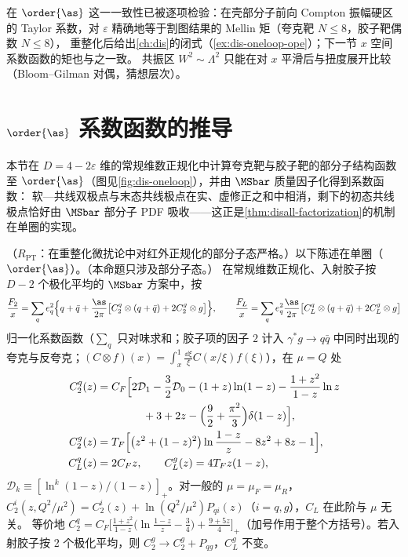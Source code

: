 \noindent
在 $\order{\as}$ 这一一致性已被逐项检验：在壳部分子前向 Compton 振幅硬区的 Taylor 系数，对 $\varepsilon$ 精确地等于割图结果的 Mellin 矩（夸克靶 $N\le8$，胶子靶偶数 $N\le8$），
重整化后给出\cref{ch:dis}的闭式（\cref{ex:dis-oneloop-ope}）；下一节 $x$ 空间系数函数的矩也与之一致。   %
共振区 $W^2\sim\Lambda^2$ 只能在对 $x$ 平滑后与扭度展开比较（Bloom--Gilman 对偶，猜想层次）。

\section{$\order{\as}$ 系数函数的推导}\label{sec:disall-nlo}

本节在 $D=4-2\varepsilon$ 维的常规维数正规化中计算夸克靶与胶子靶的部分子结构函数至 $\order{\as}$（图见\cref{fig:dis-oneloop}），并由 $\MSbar$ 质量因子化得到系数函数：
软—共线双极点与末态共线极点在实、虚修正之和中相消，剩下的初态共线极点恰好由 $\MSbar$ 部分子 PDF 吸收——这正是\cref{thm:disall-factorization}的机制在单圈的实现。

\begin{proposition}\label{prop:disall-nlo}
（$R_{\mathrm{PT}}$：在重整化微扰论中对红外正规化的部分子态严格。）以下陈述在单圈（$\order{\as}$）。（本命题只涉及部分子态。）
在常规维数正规化、入射胶子按 $D-2$ 个极化平均的 $\MSbar$ 方案中，按
\begin{equation}\label{eq:disall-norm}
\frac{F_2}{x}=\sum_qe_q^2\Big\{q+\bar q+\frac{\as}{2\pi}\big[C_2^q\otimes(q+\bar q)+2C_2^g\otimes g\big]\Big\},\qquad
\frac{F_L}{x}=\sum_qe_q^2\frac{\as}{2\pi}\big[C_L^q\otimes(q+\bar q)+2C_L^g\otimes g\big]
\end{equation}
归一化系数函数（$\sum_q$ 只对味求和；胶子项的因子 $2$ 计入 $\gamma^*g\to q\bar q$ 中同时出现的夸克与反夸克；$(C\otimes f)(x)=\int_x^1\frac{\dd\xi}\xi C(x/\xi)f(\xi)$），在 $\mu=Q$ 处
\begin{equation}\label{eq:disall-C}
\begin{aligned}
C_2^q(z)&=C_F\Big[2\mathcal D_1-\frac32\mathcal D_0-(1+z)\ln(1-z)-\frac{1+z^2}{1-z}\ln z\\
&\hspace{4.2em}+3+2z-\Big(\frac92+\frac{\pi^2}3\Big)\delta(1-z)\Big],\\
C_2^g(z)&=T_F\Big[\big(z^2+(1-z)^2\big)\ln\frac{1-z}{z}-8z^2+8z-1\Big],\\
C_L^q(z)&=2C_Fz,\qquad C_L^g(z)=4T_Fz(1-z),
\end{aligned}   %
\end{equation}
$\mathcal D_k\equiv[\ln^k(1-z)/(1-z)]_+$。对一般的 $\mu=\mu_F=\mu_R$，$C_2^i(z,Q^2/\mu^2)=C_2^i(z)+\ln(Q^2/\mu^2)P_{qi}(z)$（$i=q,g$），$C_L$ 在此阶与 $\mu$ 无关。
等价地 $C_2^q=C_F\big[\frac{1+z^2}{1-z}\big(\ln\frac{1-z}z-\frac34\big)+\frac{9+5z}4\big]_+$（加号作用于整个方括号）。若入射胶子按 2 个极化平均，则 $C_2^g\to C_2^g+P_{qg}$，$C_L^g$ 不变。
\end{proposition}

